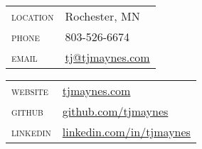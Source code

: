 \vspace{0.1in}
\begin{multicols}{2}
  \setlength{\parskip}{0pt}
  \begin{tabularx}{\linewidth}{@{}l X@{}}
    \textsc{location}    &\small{Rochester, MN}\\
    \textsc{phone}       &\small{803-526-6674}\\
    \textsc{email}       &\href{mailto:tj@tjmaynes.com}{tj@tjmaynes.com}\\
  \end{tabularx}

  \columnbreak

  \begin{tabularx}{\linewidth}{@{}l X@{}}
    \textsc{website}     &\href{https://tjmaynes.com}{tjmaynes.com}\\
    \textsc{github}      &\href{https://github.com/tjmaynes}{github.com/tjmaynes}\\
    \textsc{linkedin}    &\href{https://linkedin.com/in/tjmaynes}{linkedin.com/in/tjmaynes}\\
  \end{tabularx}
\end{multicols}
